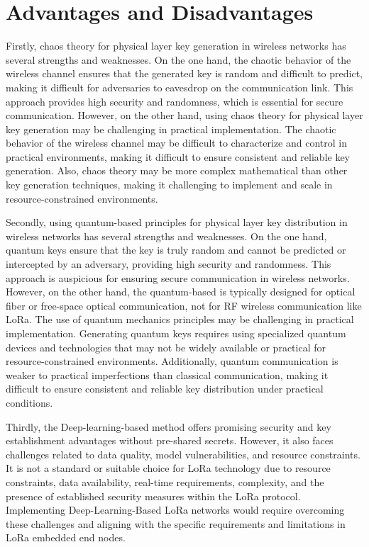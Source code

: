 \section{Advantages and Disadvantages}
Firstly, chaos theory for physical layer key generation in wireless networks has several strengths and weaknesses. On the one hand, the chaotic behavior of the wireless channel ensures that the generated key is random and difficult to predict, making it difficult for adversaries to eavesdrop on the communication link. This approach provides high security and randomness, which is essential for secure communication. However, on the other hand, using chaos theory for physical layer key generation may be challenging in practical implementation. The chaotic behavior of the wireless channel may be difficult to characterize and control in practical environments, making it difficult to ensure consistent and reliable key generation. Also, chaos theory may be more complex mathematical than other key generation techniques, making it challenging to implement and scale in resource-constrained environments.

Secondly, using quantum-based principles for physical layer key distribution in wireless networks has several strengths and weaknesses. On the one hand, quantum keys ensure that the key is truly random and cannot be predicted or intercepted by an adversary, providing high security and randomness. This approach is auspicious for ensuring secure communication in wireless networks. However, on the other hand, the quantum-based is typically designed for optical fiber or free-space optical communication, not for RF wireless communication like LoRa. The use of quantum mechanics principles may be challenging in practical implementation. Generating quantum keys requires using specialized quantum devices and technologies that may not be widely available or practical for resource-constrained environments. Additionally, quantum communication is weaker to practical imperfections than classical communication, making it difficult to ensure consistent and reliable key distribution under practical conditions. 

Thirdly, the Deep-learning-based method offers promising security and key establishment advantages without pre-shared secrets. However, it also faces challenges related to data quality, model vulnerabilities, and resource constraints. It is not a standard or suitable choice for LoRa technology due to resource constraints, data availability, real-time requirements, complexity, and the presence of established security measures within the LoRa protocol. Implementing Deep-Learning-Based LoRa networks would require overcoming these challenges and aligning with the specific requirements and limitations in LoRa embedded end nodes.

